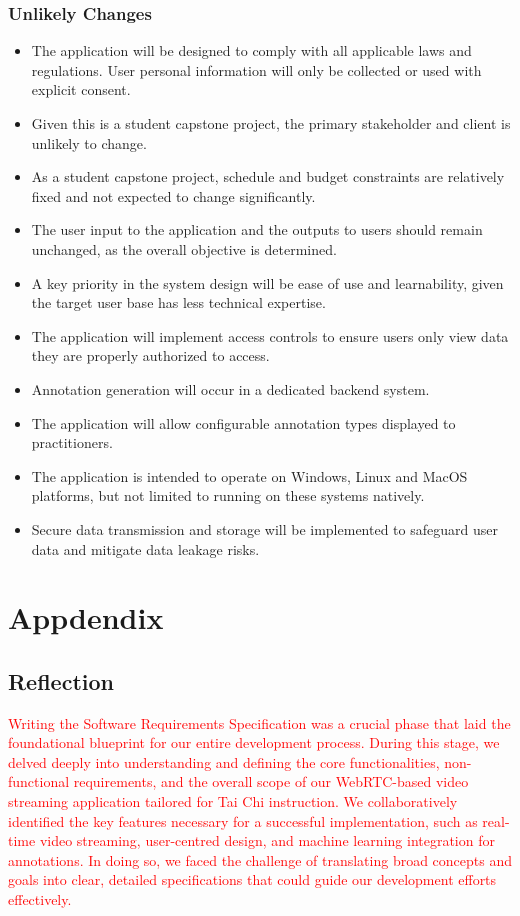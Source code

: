 \documentclass[12pt]{article}
\begin{document}
\subsubsection*{Unlikely Changes}
\begin{itemize}
  \item The application will be designed to comply with all applicable laws and regulations\cite{Law1}\cite{Law2}\cite{Law3}. User personal information will only be collected or used with explicit consent.
  \item Given this is a student capstone project, the primary stakeholder and client is unlikely to change.
  \item As a student capstone project, schedule and budget constraints are relatively fixed and not expected to change significantly.
  \item The user input to the application and the outputs to users should remain unchanged, as the overall objective is determined.
  \item A key priority in the system design will be ease of use and learnability, given the target user base has less technical expertise.
  \item The application will implement access controls to ensure users only view data they are properly authorized to access.
  \item Annotation generation will occur in a dedicated backend system.
  \item The application will allow configurable annotation types displayed to practitioners.
  \item The application is intended to operate on Windows, Linux and MacOS platforms, but not limited to running on these systems natively.
  \item Secure data transmission and storage will be implemented to safeguard user data and mitigate data leakage risks.
\end{itemize}

\section{Appdendix}

\subsection{Reflection}

\textcolor{red}{Writing the Software Requirements Specification was a crucial phase that laid the foundational blueprint for our 
entire development process. During this stage, we delved deeply into understanding and defining the core functionalities, 
non-functional requirements, and the overall scope of our WebRTC-based video streaming application tailored for Tai Chi 
instruction. We collaboratively identified the key features necessary for a successful implementation, such as real-time 
video streaming, user-centred design, and machine learning integration for annotations. In doing so, we faced the challenge 
of translating broad concepts and goals into clear, detailed specifications that could guide our development efforts effectively.}
\end{document}
